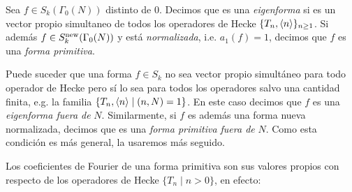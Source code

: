 \begin{defin}\label{def:formaprimitiva}
  Sea $f\in S_k(\Gamma_0(N))$ distinto de 0. Decimos que es una \emph{eigenforma} si es un vector
  propio simultaneo de todos los operadores de Hecke $\{T_n,\langle n \rangle\}_{n\geq1}$. Si adem\'as
  $f\in S_k^{\mathrm{new}}(\Gamma_0(N))$ y est\'a \emph{normalizada}, i.e. $a_1(f)=1$, decimos que $f$ es una
  \emph{forma primitiva}.
\end{defin}

\begin{nota}
  Puede suceder que una forma $f\in S_k$ no sea vector propio simultáneo para todo operador de Hecke pero s\'i lo sea para todos los operadores salvo una cantidad finita, e.g. la familia  $\{T_n,\langle n \rangle\mid (n,N)=1\}$. En
  este caso decimos que $f$ es una \emph{eigenforma fuera de} $N$. Similarmente, si $f$ es adem\'as una
  forma nueva normalizada, decimos que es una \emph{forma primitiva fuera de} $N$. Como esta condición es más general, la usaremos más seguido.
\end{nota}

Los coeficientes de Fourier de una forma primitiva son sus valores propios con respecto de los operadores de Hecke $\{T_n\mid n>0\}$, en efecto:

